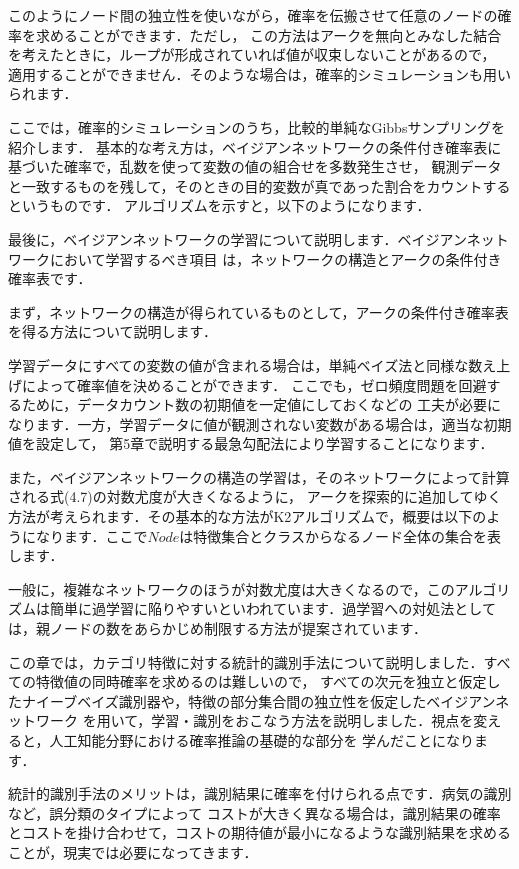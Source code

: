 
このようにノード間の独立性を使いながら，確率を伝搬させて任意のノードの確率を求めることができます．ただし，
この方法はアークを無向とみなした結合を考えたときに，ループが形成されていれば値が収束しないことがあるので，
適用することができません．そのような場合は，確率的シミュレーションも用いられます．


ここでは，確率的シミュレーションのうち，比較的単純なGibbsサンプリングを紹介します．
基本的な考え方は，ベイジアンネットワークの条件付き確率表に基づいた確率で，乱数を使って変数の値の組合せを多数発生させ，
観測データと一致するものを残して，そのときの目的変数が真であった割合をカウントするというものです．
アルゴリズムを示すと，以下のようになります．



最後に，ベイジアンネットワークの学習について説明します．ベイジアンネットワークにおいて学習するべき項目
は，ネットワークの構造とアークの条件付き確率表です．

まず，ネットワークの構造が得られているものとして，アークの条件付き確率表を得る方法について説明します．

学習データにすべての変数の値が含まれる場合は，単純ベイズ法と同様な数え上げによって確率値を決めることができます．
ここでも，ゼロ頻度問題を回避するために，データカウント数の初期値を一定値にしておくなどの
工夫が必要になります．一方，学習データに値が観測されない変数がある場合は，適当な初期値を設定して，
第5章で説明する最急勾配法により学習することになります．

また，ベイジアンネットワークの構造の学習は，そのネットワークによって計算される式(4.7)の対数尤度が大きくなるように，
アークを探索的に追加してゆく方法が考えられます．その基本的な方法がK2アルゴリズムで，概要は以下のようになります．ここで$Node$は特徴集合とクラスからなるノード全体の集合を表します．


一般に，複雑なネットワークのほうが対数尤度は大きくなるので，このアルゴリズムは簡単に過学習に陥りやすいといわれています．過学習への対処法としては，親ノードの数をあらかじめ制限する方法が提案されています．


この章では，カテゴリ特徴に対する統計的識別手法について説明しました．すべての特徴値の同時確率を求めるのは難しいので，
すべての次元を独立と仮定したナイーブベイズ識別器や，特徴の部分集合間の独立性を仮定したベイジアンネットワーク
を用いて，学習・識別をおこなう方法を説明しました．視点を変えると，人工知能分野における確率推論の基礎的な部分を
学んだことになります．

統計的識別手法のメリットは，識別結果に確率を付けられる点です．病気の識別など，誤分類のタイプによって
コストが大きく異なる場合は，識別結果の確率とコストを掛け合わせて，コストの期待値が最小になるような識別結果を求める
ことが，現実では必要になってきます．
